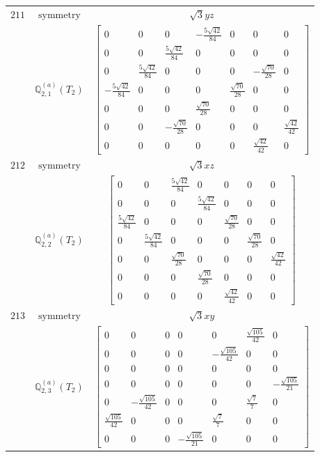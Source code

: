 \documentclass[fleqn,8pt,landscape]{jsarticle}
\begin{document}
\begin{longtable}{ccc}
$ 211 $ & $ \text{symmetry} $ & $ \sqrt{3} y z $ \\
$  $ & $ \mathbb{Q}_{2,1}^{(a)}(T_{2}) $ & $ \begin{bmatrix} 0 & 0 & 0 & - \frac{5 \sqrt{42}}{84} & 0 & 0 & 0 \\ 0 & 0 & \frac{5 \sqrt{42}}{84} & 0 & 0 & 0 & 0 \\ 0 & \frac{5 \sqrt{42}}{84} & 0 & 0 & 0 & - \frac{\sqrt{70}}{28} & 0 \\ - \frac{5 \sqrt{42}}{84} & 0 & 0 & 0 & \frac{\sqrt{70}}{28} & 0 & 0 \\ 0 & 0 & 0 & \frac{\sqrt{70}}{28} & 0 & 0 & 0 \\ 0 & 0 & - \frac{\sqrt{70}}{28} & 0 & 0 & 0 & \frac{\sqrt{42}}{42} \\ 0 & 0 & 0 & 0 & 0 & \frac{\sqrt{42}}{42} & 0 \end{bmatrix} $ \\ \hline
$ 212 $ & $ \text{symmetry} $ & $ \sqrt{3} x z $ \\
$  $ & $ \mathbb{Q}_{2,2}^{(a)}(T_{2}) $ & $ \begin{bmatrix} 0 & 0 & \frac{5 \sqrt{42}}{84} & 0 & 0 & 0 & 0 \\ 0 & 0 & 0 & \frac{5 \sqrt{42}}{84} & 0 & 0 & 0 \\ \frac{5 \sqrt{42}}{84} & 0 & 0 & 0 & \frac{\sqrt{70}}{28} & 0 & 0 \\ 0 & \frac{5 \sqrt{42}}{84} & 0 & 0 & 0 & \frac{\sqrt{70}}{28} & 0 \\ 0 & 0 & \frac{\sqrt{70}}{28} & 0 & 0 & 0 & \frac{\sqrt{42}}{42} \\ 0 & 0 & 0 & \frac{\sqrt{70}}{28} & 0 & 0 & 0 \\ 0 & 0 & 0 & 0 & \frac{\sqrt{42}}{42} & 0 & 0 \end{bmatrix} $ \\ \hline
$ 213 $ & $ \text{symmetry} $ & $ \sqrt{3} x y $ \\
$  $ & $ \mathbb{Q}_{2,3}^{(a)}(T_{2}) $ & $ \begin{bmatrix} 0 & 0 & 0 & 0 & 0 & \frac{\sqrt{105}}{42} & 0 \\ 0 & 0 & 0 & 0 & - \frac{\sqrt{105}}{42} & 0 & 0 \\ 0 & 0 & 0 & 0 & 0 & 0 & 0 \\ 0 & 0 & 0 & 0 & 0 & 0 & - \frac{\sqrt{105}}{21} \\ 0 & - \frac{\sqrt{105}}{42} & 0 & 0 & 0 & \frac{\sqrt{7}}{7} & 0 \\ \frac{\sqrt{105}}{42} & 0 & 0 & 0 & \frac{\sqrt{7}}{7} & 0 & 0 \\ 0 & 0 & 0 & - \frac{\sqrt{105}}{21} & 0 & 0 & 0 \end{bmatrix} $ \\ \hline

\end{longtable}
\end{document}
